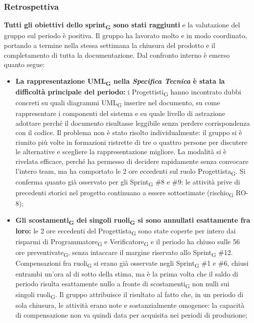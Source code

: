 ﻿\documentclass[a4paper, 10pt, colorlinks=true, linkcolor=black, urlcolor=blue, citecolor=blue, hidelinks]{article}
\begin{document}
\subsubsection{Retrospettiva}
\textbf{Tutti gli obiettivi dello sprint\textsubscript{G} sono stati raggiunti} e la valutazione del gruppo sul periodo è positiva. Il gruppo ha lavorato molto e in modo coordinato, portando a termine nella stessa settimana la chiusura del prodotto e il completamento di tutta la documentazione. Dal confronto interno è emerso quanto segue:
\begin{itemize}
    \item \textbf{La rappresentazione UML\textsubscript{G} nella \textit{Specifica Tecnica} è stata la difficoltà principale del periodo:} i Progettisti\textsubscript{G} hanno incontrato dubbi concreti su quali diagrammi UML\textsubscript{G} inserire nel documento, su come rappresentare i componenti del sistema e su quale livello di astrazione adottare perché il documento risultasse leggibile senza perdere corrispondenza con il codice. Il problema non è stato risolto individualmente: il gruppo si è riunito più volte in formazioni ristrette di tre o quattro persone per discutere le alternative e scegliere la rappresentazione migliore. La modalità si è rivelata efficace, perché ha permesso di decidere rapidamente senza convocare l'intero team, ma ha comportato le 2 ore eccedenti sul ruolo Progettista\textsubscript{G}. Si conferma quanto già osservato per gli Sprint\textsubscript{G} \#8 e \#9: le attività prive di precedenti storici nel progetto continuano a essere sottostimate (rischio\textsubscript{G} RO-8);

    \item \textbf{Gli scostamenti\textsubscript{G} dei singoli ruoli\textsubscript{G} si sono annullati esattamente fra loro:} le 2 ore eccedenti del Progettista\textsubscript{G} sono state coperte per intero dai risparmi di Programmatore\textsubscript{G} e Verificatore\textsubscript{G} e il periodo ha chiuso sulle 56 ore preventivate\textsubscript{G}, senza intaccare il margine riservato allo Sprint\textsubscript{G} \#12. Compensazioni fra ruoli\textsubscript{G} si erano già osservate negli Sprint\textsubscript{G} \#1 e \#6, chiusi entrambi un'ora al di sotto della stima, ma è la prima volta che il saldo di periodo risulta esattamente nullo a fronte di scostamenti\textsubscript{G} non nulli sui singoli ruoli\textsubscript{G}. Il gruppo attribuisce il risultato al fatto che, in un periodo di sola chiusura, le attività erano note e sostanzialmente omogenee: la capacità di compensazione non va quindi data per acquisita nei periodi di produzione;


\end{itemize}
\end{document}
